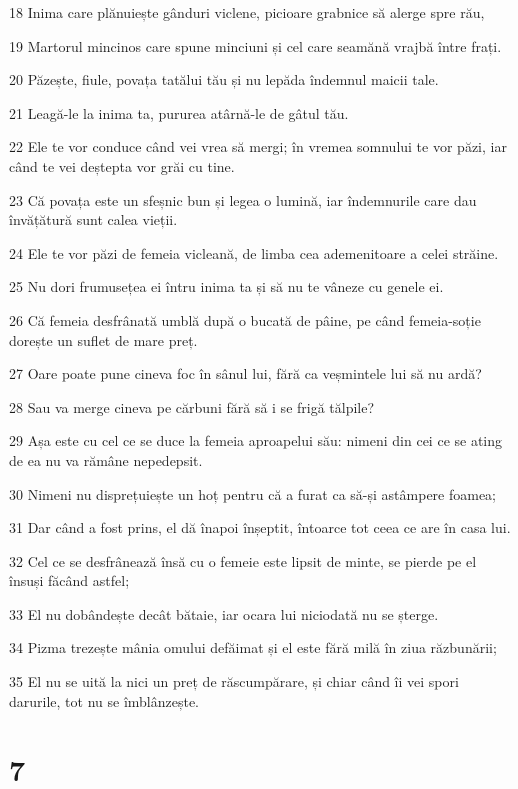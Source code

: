 \par 18 Inima care plănuiește gânduri viclene, picioare grabnice să alerge spre rău,
\par 19 Martorul mincinos care spune minciuni și cel care seamănă vrajbă între frați.
\par 20 Păzește, fiule, povața tatălui tău și nu lepăda îndemnul maicii tale.
\par 21 Leagă-le la inima ta, pururea atârnă-le de gâtul tău.
\par 22 Ele te vor conduce când vei vrea să mergi; în vremea somnului te vor păzi, iar când te vei deștepta vor grăi cu tine.
\par 23 Că povața este un sfeșnic bun și legea o lumină, iar îndemnurile care dau învățătură sunt calea vieții.
\par 24 Ele te vor păzi de femeia vicleană, de limba cea ademenitoare a celei străine.
\par 25 Nu dori frumusețea ei întru inima ta și să nu te vâneze cu genele ei.
\par 26 Că femeia desfrânată umblă după o bucată de pâine, pe când femeia-soție dorește un suflet de mare preț.
\par 27 Oare poate pune cineva foc în sânul lui, fără ca veșmintele lui să nu ardă?
\par 28 Sau va merge cineva pe cărbuni fără să i se frigă tălpile?
\par 29 Așa este cu cel ce se duce la femeia aproapelui său: nimeni din cei ce se ating de ea nu va rămâne nepedepsit.
\par 30 Nimeni nu disprețuiește un hoț pentru că a furat ca să-și astâmpere foamea;
\par 31 Dar când a fost prins, el dă înapoi înșeptit, întoarce tot ceea ce are în casa lui.
\par 32 Cel ce se desfrânează însă cu o femeie este lipsit de minte, se pierde pe el însuși făcând astfel;
\par 33 El nu dobândește decât bătaie, iar ocara lui niciodată nu se șterge.
\par 34 Pizma trezește mânia omului defăimat și el este fără milă în ziua răzbunării;
\par 35 El nu se uită la nici un preț de răscumpărare, și chiar când îi vei spori darurile, tot nu se îmblânzește.

\chapter{7}

